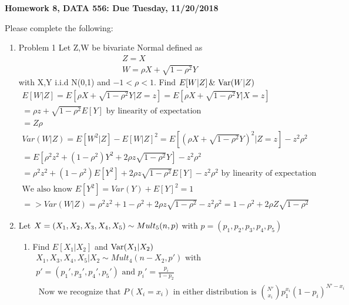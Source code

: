 \documentclass[11pt]{article}
\newcommand{\Var}{\mathop{\rm Var}}
\begin{document}
	
	\begin{title}
		{\Large\bf Homework 8, DATA 556: Due Tuesday, 11/20/2018}
	\end{title}
	
	\author{\bf Alexander Van Roijen}
	
	\maketitle
	
	\newpage
	Please complete the following:
	\begin{enumerate}
		\item Problem 1
		Let Z,W be bivariate Normal defined as
		\begin{gather}
		Z=X\\
		W=\rho X + \sqrt{1-\rho^2}Y
		\end{gather}
		with X,Y i.i.d N(0,1) and $-1<\rho<1$. Find $E[W|Z] \, \& \, \Var(W|Z)$
		\begin{gather}
		E[W|Z] = E[\rho X + \sqrt{1-\rho^2}Y|Z=z] = E[\rho X + \sqrt{1-\rho^2}Y|X=z]\\
		= \rho z + \sqrt{1-\rho^2}E[Y] \text{ by linearity of expectation}\\
		= Z\rho
		\\
		Var(W|Z) = E[W^2|Z]-E[W|Z]^2 = E[(\rho X + \sqrt{1-\rho^2}Y)^2|Z=z] - z^2 \rho^2\\ = E[\rho^2z^2 + (1-\rho^2)Y^2 + 2\rho z\sqrt{1-\rho^2}Y] - z^2\rho^2\\
		= \rho^2z^2 + (1-\rho^2)E[Y^2] + 2\rho z\sqrt{1-\rho^2}E[Y] - z^2\rho^2\text{ by linearity of expectation}\\
		\text{We also know }E[Y^2]=Var(Y)+E[Y]^2 = 1\\
		=>Var(W|Z) =  \rho^2z^2 + 1 - \rho^2 + 2\rho z\sqrt{1-\rho^2} - z^2\rho^2 = 1 - \rho^2 + 2\rho Z\sqrt{1-\rho^2}
		\end{gather}
		\item Let $X = (X_1,X_2,X_3,X_4,X_5) \sim Mult_5(n,\boldmath{p})$ with $p = (p_1,p_2,p_3,p_4,p_5)$
		\begin{enumerate}
			\item Find $E[X_1|X_2]$ and $\Var(X_1|X_2)$
			\begin{gather}
			X_1,X_3,X_4,X_5 | X_2 \sim Mult_4(n-X_2,p') \text{ with }\\
			p'=(p_1',p_3',p_4',p_5')\text{ and } p_i'= \frac{p_i}{1-p_2}\\
			\text{ Now we recognize that } P(X_i=x_i) \text{ in either distribution is }
			\binom{N'}{x_i}p_1^{x_i}(1-p_i)^{N'-x_i}\\

\end{gather}
\end{enumerate}
\end{enumerate}
\end{document}
